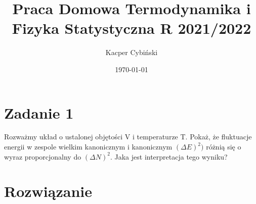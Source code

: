 \documentclass[12pt,a4paper]{article}
\title{Praca Domowa Termodynamika i Fizyka Statystyczna R 2021/2022}
\author{Kacper Cybiński}
\date{\today}
\begin{document}
\maketitle

\section{Zadanie 1}

Rozważmy układ o ustalonej objętości V i temperaturze T. Pokaż, że fluktuacje energii w zespole wielkim kanonicznym i kanonicznym $(\Delta E)^2)$ różnią się o wyraz proporcjonalny do 
$(\Delta N)^2$. Jaka jest interpretacja tego wyniku?

\section{Rozwiązanie}
\end{document}
